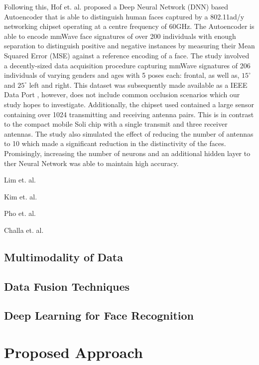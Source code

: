 \documentclass{interim}
\begin{document}
Following this, Hof et. al. \cite{hof2020face} proposed a Deep Neural Network (DNN) based Autoencoder that is able to distinguish human faces captured by a 802.11ad/y networking chipset operating at a centre frequency of 60GHz. The Autoencoder is able to encode mmWave face signatures of over 200 individuals with enough separation to distinguish positive and negative instances by measuring their Mean Squared Error (MSE) against a reference encoding of a face. The study involved a decently-sized data acquisition procedure capturing mmWave signatures of 206 individuals of varying genders and ages with 5 poses each: frontal, as well as, $15^\circ$ and $25^\circ$ left and right. This dataset was subsequently made available as a IEEE Data Port \cite{mmwavefacedata}, however, does not include common occlusion scenarios which our study hopes to investigate. Additionally, the chipset used contained a large sensor containing over 1024 transmitting and receiving antenna pairs. This is in contrast to the compact mobile Soli chip with a single transmit and three receiver antennas. The study also simulated the effect of reducing the number of antennas to 10 which made a significant reduction in the distinctivity of the faces. Promisingly, increasing the number of neurons and an additional hidden layer to ther Neural Network was able to maintain high accuracy.

Lim et. al. \cite{lim2020dnn}

Kim et. al. \cite{kim2020face}

Pho et. al. \cite{pho2021radar}

Challa et. al. \cite{challa2021face}

\subsection{Multimodality of Data}

\subsection{Data Fusion Techniques}

\subsection{Deep Learning for Face Recognition}

\section{Proposed Approach}
\end{document}
